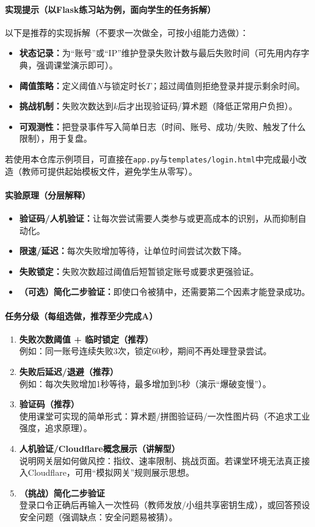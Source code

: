 \documentclass[UTF8,a4paper,12pt]{ctexart}
\begin{document}
\paragraph{实现提示（以Flask练习站为例，面向学生的任务拆解）}
以下是推荐的实现拆解（不要求一次做全，可按小组能力选做）：
\begin{itemize}
  \item \textbf{状态记录：}为``账号''或``IP''维护登录失败计数与最后失败时间（可先用内存字典，强调课堂演示即可）。
  \item \textbf{阈值策略：}定义阈值$N$与锁定时长$T$；超过阈值则拒绝登录并提示剩余时间。
  \item \textbf{挑战机制：}失败次数达到$k$后才出现验证码/算术题（降低正常用户负担）。
  \item \textbf{可观测性：}把登录事件写入简单日志（时间、账号、成功/失败、触发了什么限制），用于复盘。
\end{itemize}
若使用本仓库示例项目，可直接在\texttt{app.py}与\texttt{templates/login.html}中完成最小改造（教师可提供起始模板文件，避免学生从零写）。

\paragraph{实验原理（分层解释）}
\begin{itemize}
  \item \textbf{验证码/人机验证：}让每次尝试需要人类参与或更高成本的识别，从而抑制自动化。
  \item \textbf{限速/延迟：}每次失败增加等待，让单位时间尝试次数下降。
  \item \textbf{失败锁定：}失败次数超过阈值后短暂锁定账号或要求更强验证。
  \item \textbf{（可选）简化二步验证：}即使口令被猜中，还需要第二个因素才能登录成功。
\end{itemize}

\paragraph{任务分级（每组选做，推荐至少完成A）}
\begin{enumerate}[label=\textbf{\Alph*.}]
  \item \textbf{失败次数阈值 + 临时锁定（推荐）}\\
  例如：同一账号连续失败3次，锁定60秒，期间不再处理登录尝试。
  \item \textbf{失败后延迟/退避（推荐）}\\
  例如：每次失败增加1秒等待，最多增加到5秒（演示``爆破变慢''）。
  \item \textbf{验证码（推荐）}\\
  使用课堂可实现的简单形式：算术题/拼图验证码/一次性图片码（不追求工业强度，追求原理）。
  \item \textbf{人机验证/Cloudflare概念展示（讲解型）}\\
  说明网关层如何做风控：指纹、速率限制、挑战页面。若课堂环境无法真正接入Cloudflare，可用``模拟网关''规则展示思想。
  \item \textbf{（挑战）简化二步验证}\\
  登录口令正确后再输入一次性码（教师发放/小组共享密钥生成），或回答预设安全问题（强调缺点：安全问题易被猜）。
\end{enumerate}
\end{document}
